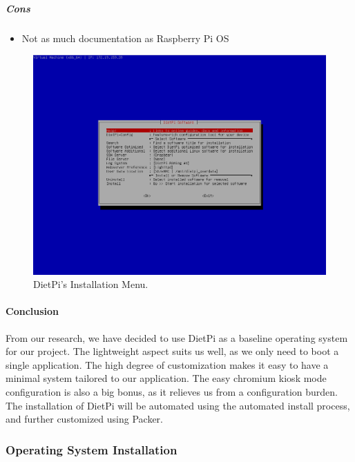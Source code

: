 \subparagraph{Cons}
\begin{itemize}
  \item Not as much documentation as Raspberry Pi OS
\end{itemize}

\begin{figure}[h!]
  \centering
  \includegraphics[width=\linewidth]{image/dietpi-config.png}
  \caption{DietPi's Installation Menu.}
  \label{fig:dietpi}
\end{figure}

\paragraph{Conclusion}

From our research, we have decided to use DietPi as a baseline operating system for our
project. The lightweight aspect suits us well, as we only need to boot a single
application. The high degree of customization makes it easy to have a minimal system
tailored to our application. The easy chromium kiosk mode configuration is also a big
bonus, as it relieves us from a configuration burden. The installation of DietPi will be
automated using the automated install process, and further customized using Packer.

\subsubsection{Operating System Installation}


